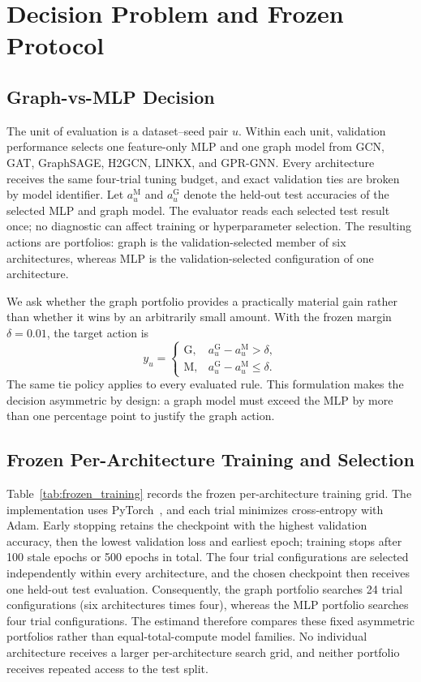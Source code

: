 \section{Decision Problem and Frozen Protocol}
\label{sec:protocol}

\subsection{Graph-vs-MLP Decision}

The unit of evaluation is a dataset--seed pair $u$. Within each unit, validation performance selects one feature-only MLP and one graph model from GCN, GAT, GraphSAGE, H2GCN, LINKX, and GPR-GNN. Every architecture receives the same four-trial tuning budget, and exact validation ties are broken by model identifier. Let $a_u^{\mathrm{M}}$ and $a_u^{\mathrm{G}}$ denote the held-out test accuracies of the selected MLP and graph model. The evaluator reads each selected test result once; no diagnostic can affect training or hyperparameter selection. The resulting actions are portfolios: graph is the validation-selected member of six architectures, whereas MLP is the validation-selected configuration of one architecture.

We ask whether the graph portfolio provides a practically material gain rather than whether it wins by an arbitrarily small amount. With the frozen margin $\delta=0.01$, the target action is
\begin{equation}
y_u =
\begin{cases}
\mathrm{G}, & a_u^{\mathrm{G}}-a_u^{\mathrm{M}}>\delta,\\
\mathrm{M}, & a_u^{\mathrm{G}}-a_u^{\mathrm{M}}\leq\delta.
\end{cases}
\label{eq:decision_target}
\end{equation}
The same tie policy applies to every evaluated rule. This formulation makes the decision asymmetric by design: a graph model must exceed the MLP by more than one percentage point to justify the graph action.

\subsection{Frozen Per-Architecture Training and Selection}

Table~\ref{tab:frozen_training} records the frozen per-architecture training grid. The implementation uses PyTorch~\citep{paszke2019pytorch}, and each trial minimizes cross-entropy with Adam. Early stopping retains the checkpoint with the highest validation accuracy, then the lowest validation loss and earliest epoch; training stops after 100 stale epochs or 500 epochs in total. The four trial configurations are selected independently within every architecture, and the chosen checkpoint then receives one held-out test evaluation. Consequently, the graph portfolio searches 24 trial configurations (six architectures times four), whereas the MLP portfolio searches four trial configurations. The estimand therefore compares these fixed asymmetric portfolios rather than equal-total-compute model families. No individual architecture receives a larger per-architecture search grid, and neither portfolio receives repeated access to the test split.

